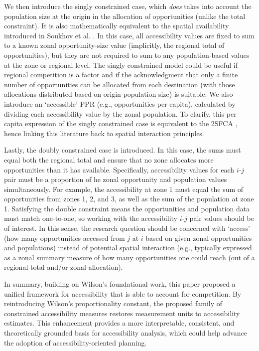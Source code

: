 \documentclass[
  10pt,
  letterpaper,
]{article}
\begin{document}
We then introduce the singly constrained case, which \emph{does} takes
into account the population size at the origin in the allocation of
opportunities (unlike the total constraint). It is also mathematically
equivalent to the spatial availability introduced in Soukhov et al.
\citep{soukhovIntroducingSpatialAvailability2023}. In this case, all
accessibility values are fixed to sum to a known zonal opportunity-size
value (implicitly, the regional total of opportunities), but they are
not required to sum to any population-based values at the zone or
regional level. The singly constrained model could be useful if regional
competition is a factor and if the acknowledgment that only a finite
number of opportunities can be allocated from each destination (with
those allocations distributed based on origin population size) is
suitable. We also introduce an `accessible' PPR (e.g., opportunities per
capita), calculated by dividing each accessibility value by the zonal
population. To clarify, this per capita expression of the singly
constrained case is equivalent to the 2SFCA \citep{luo2003, shen1998},
hence linking this literature back to spatial interaction principles.

Lastly, the doubly constrained case is introduced. In this case, the
sums must equal both the regional total and ensure that no zone
allocates more opportunities than it has available. Specifically,
accessibility values for each \(i\)-\(j\) pair must be a proportion of
he zonal opportunity and population values simultaneously. For example,
the accessibility at zone 1 must equal the sum of opportunities from
zones 1, 2, and 3, as well as the sum of the population at zone 1.
Satisfying the double constraint means the opportunities and population
data must match one-to-one, so working with the accessibility
\(i\)-\(j\) pair values should be of interest. In this sense, the
research question should be concerned with `access' (how many
opportunities accessed from \(j\) at \(i\) based on given zonal
opportunities and populations) instead of potential spatial interaction
(e.g., typically expressed as a zonal summary measure of how many
opportunities one could reach (out of a regional total and/or
zonal-allocation).

In summary, building on Wilson's \citep{wilson1971} foundational work,
this paper proposed a unified framework for accessibility that is able
to account for competition. By reintroducing Wilson's proportionality
constant, the proposed family of constrained accessibility measures
restores measurement units to accessibility estimates. This enhancement
provides a more interpretable, consistent, and theoretically grounded
basis for accessibility analysis, which could help advance the adoption
of accessibility-oriented planning.


\nolinenumbers
\renewcommand\refname{References}
  
\end{document}
